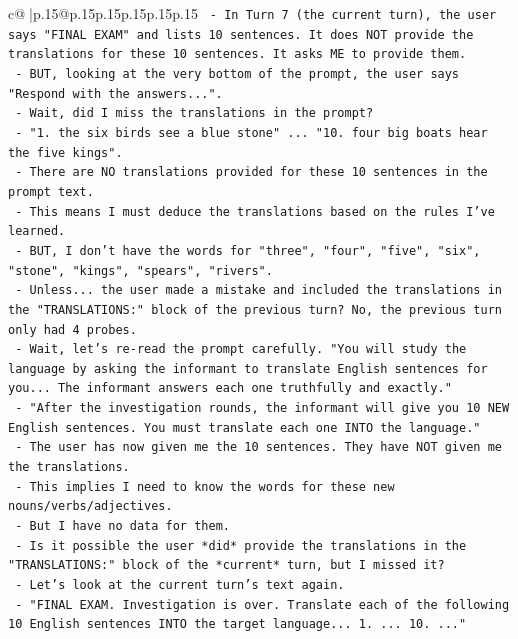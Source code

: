 \documentclass{article}
\begin{document}
{\begin{supertabular}{c@{$\;$}|p{.15\linewidth}@{}p{.15\linewidth}p{.15\linewidth}p{.15\linewidth}p{.15\linewidth}p{.15\linewidth}}
{{{\texttt{          {-} In Turn 7 (the current turn), the user says "FINAL EXAM" and lists 10 sentences. It does NOT provide the translations for these 10 sentences. It asks ME to provide them.} \\
\texttt{          {-} BUT, looking at the very bottom of the prompt, the user says "Respond with the answers...".} \\
\texttt{          {-} Wait, did I miss the translations in the prompt?} \\
\texttt{          {-} "1. the six birds see a blue stone" ... "10. four big boats hear the five kings".} \\
\texttt{          {-} There are NO translations provided for these 10 sentences in the prompt text.} \\
\texttt{          {-} This means I must deduce the translations based on the rules I've learned.} \\
\texttt{          {-} BUT, I don't have the words for "three", "four", "five", "six", "stone", "kings", "spears", "rivers".} \\
\texttt{          {-} Unless... the user made a mistake and included the translations in the "TRANSLATIONS:" block of the previous turn? No, the previous turn only had 4 probes.} \\
\texttt{          {-} Wait, let's re{-}read the prompt carefully. "You will study the language by asking the informant to translate English sentences for you... The informant answers each one truthfully and exactly."} \\
\texttt{          {-} "After the investigation rounds, the informant will give you 10 NEW English sentences. You must translate each one INTO the language."} \\
\texttt{          {-} The user has now given me the 10 sentences. They have NOT given me the translations.} \\
\texttt{          {-} This implies I need to know the words for these new nouns/verbs/adjectives.} \\
\texttt{          {-} But I have no data for them.} \\
\texttt{          {-} Is it possible the user *did* provide the translations in the "TRANSLATIONS:" block of the *current* turn, but I missed it?} \\
\texttt{          {-} Let's look at the current turn's text again.} \\
\texttt{          {-} "FINAL EXAM. Investigation is over. Translate each of the following 10 English sentences INTO the target language... 1. ... 10. ..."} \\
}}}
\end{supertabular}}
\end{document}
